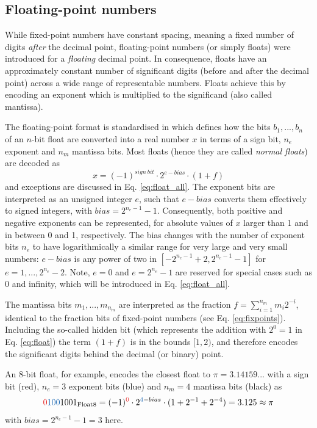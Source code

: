 \subsection{Floating-point numbers}
\label{sec:floats}

While fixed-point numbers have constant spacing, meaning a fixed number of digits \emph{after} the decimal point, floating-point
numbers (or simply floats) were introduced for a \emph{floating} decimal point. In consequence, floats have an approximately constant
number of significant digits (before and after the decimal point) across a wide range of representable numbers. Floats
achieve this by encoding an exponent which is multiplied to the significand (also called mantissa).

The floating-point format is standardised in \cite{IEEE1985,IEEE2008} which defines how the bits $b_1,...,b_n$ of an
$n$-bit float are converted into a real number $x$ in terms of a sign bit, $n_e$ exponent and $n_m$ mantissa bits.
Most floats (hence they are called \emph{normal floats}) are decoded as
\begin{equation}
x = (-1)^{sign~bit} \cdot 2^{e-bias} \cdot (1+f)
\label{eq:float}
\end{equation}
and exceptions are discussed in Eq. \ref{eq:float_all}. The exponent bits are interpreted as an unsigned integer $e$, such that $e-bias$ converts
them effectively to signed integers, with $bias = 2^{n_e-1}-1$. Consequently, both positive and negative exponents can be represented,
for absolute values of $x$ larger than 1 and in between 0 and 1, respectively. The bias changes with the number of exponent
bits $n_e$ to have logarithmically a similar range for very large and very small numbers: $e-bias$ is any power of two in
$[-2^{n_e-1}+2,2^{n_e-1}-1]$ for $e=1,...,2^{n_e}-2$. Note, $e=0$ and $e=2^{n_e}-1$ are reserved for special cases such as 0 and infinity,
which will be introduced in Eq. \ref{eq:float_all}.

The mantissa bits $m_1,...,m_{n_m}$ are interpreted as the fraction $f = \sum_{i=1}^{n_m} m_i 2^{-i}$, identical to the fraction bits
of fixed-point numbers (see Eq. \ref{eq:fixpoints}). Including the so-called hidden bit (which represents the addition with $2^0 = 1$
in Eq. \ref{eq:float}) the term $(1+f)$ is in the bounds $[1,2)$, and therefore encodes the significant digits behind the decimal (or binary)
point.

An 8-bit float, for example, encodes the closest float to $\pi = 3.14159...$ with a sign bit (red), $n_e = 3$ exponent bits (blue) and
$n_m=4$ mantissa bits (black) as
\begin{equation}
{\color{psign}0}{\color{pexpo}100}1001_{\op{Float8}} = (-1)^{\color{psign}0} \cdot 2^{{\color{pexpo}4}-bias}
\cdot (1+2^{-1}+2^{-4}) = 3.125 \approx \pi
\label{eq:float8}
\end{equation}
with $bias=2^{n_e-1} - 1 = 3$ here.

